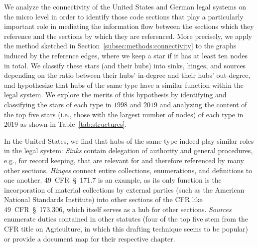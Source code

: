We analyze the connectivity of the United States and German legal systems on the micro level in order to identify those code sections that play a particularly important role in mediating the information flow between the sections which they reference and the sections by which they are referenced.
More precisely, we apply the method sketched in Section~\ref{subsec:methods:connectivity} to the graphs induced by the reference edges, where we keep a star if it has at least ten nodes in total. 
We classify these stars (and their hubs) into sinks, hinges, and sources depending on the ratio between their hubs' in-degree and their hubs' out-degree, and hypothesize that hubs of the same type have a similar function within the legal system. 
We explore the merits of this hypothesis by identifying and classifying the stars of each type in $1998$ and $2019$ and analyzing the content of the top five stars (i.e., those with the largest number of nodes) of each type in $2019$ as shown in Table~\ref{tab:structures}.

\begin{table}
	\centering
	
	\caption{%
		Top five reference stars of each type in $2019$ for the United States (top) and Germany (bottom), 
		with stars whose hubs are contained in regulations marked grey.
		Edge and degree counts exclude multi-edges; 
		$m_S$ is the number of edges between spokes, 
		$\delta^+$ is the hub's out-degree, 
		and $\delta^-$ is the hub's in-degree.
	}\label{tab:structures}
	\vspace*{-6pt}
\end{table}

In the United States, we find that hubs of the same type indeed play similar roles in the legal system: 
\emph{Sinks} contain delegation of authority and general procedures, e.g., for record keeping, that are relevant for and therefore referenced by many other sections.
\emph{Hinges} connect entire collections, enumerations, and definitions to one another. 
49~CFR~§~171.7 is an example, as its only function is the incorporation of material collections by external parties (such as the American National Standards Institute) into other sections of the CFR like 49~CFR~§~173.306, which itself serves as a hub for other sections. 
\emph{Sources} enumerate duties contained in other statutes (four of the top five stem from the CFR title on Agriculture, in which this drafting technique seems to be popular) or provide a document map for their respective chapter. 

